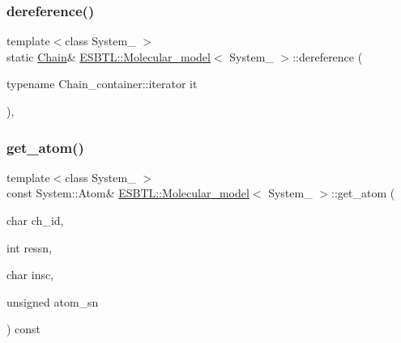 \subsubsection{\texorpdfstring{dereference()}{dereference()}\hspace{0.1cm}{\footnotesize\ttfamily [2/2]}}
{\footnotesize\ttfamily template$<$class System\+\_\+ $>$ \\
static \hyperlink{classESBTL_1_1Molecular__model_a1d055eb841e64e198a1987e120fc985d}{Chain}\& \hyperlink{classESBTL_1_1Molecular__model}{E\+S\+B\+T\+L\+::\+Molecular\+\_\+model}$<$ System\+\_\+ $>$\+::dereference (\begin{DoxyParamCaption}\item[{typename Chain\+\_\+container\+::iterator}]{it }\end{DoxyParamCaption})\hspace{0.3cm}{\ttfamily [inline]}, {\ttfamily [static]}}

\mbox{\label{classESBTL_1_1Molecular__model_a40c036810c7d02d0b4f6adb65b3c0205}} 
\subsubsection{\texorpdfstring{get\+\_\+atom()}{get\_atom()}}
{\footnotesize\ttfamily template$<$class System\+\_\+ $>$ \\
const System\+::\+Atom\& \hyperlink{classESBTL_1_1Molecular__model}{E\+S\+B\+T\+L\+::\+Molecular\+\_\+model}$<$ System\+\_\+ $>$\+::get\+\_\+atom (\begin{DoxyParamCaption}\item[{char}]{ch\+\_\+id,  }\item[{int}]{ressn,  }\item[{char}]{insc,  }\item[{unsigned}]{atom\+\_\+sn }\end{DoxyParamCaption}) const\hspace{0.3cm}{\ttfamily [inline]}}

\mbox{\label{classESBTL_1_1Molecular__model_a3ccd03e2055e57d67b315ff990094b82}} 
